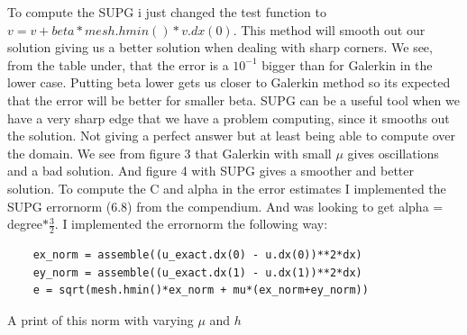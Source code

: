 \documentclass[a4paper,norsk]{article}
\begin{document}
To compute the SUPG i just changed the test function to  $v = v + beta * mesh.hmin() * v.dx(0)$. This method will smooth out our solution giving us a better solution when dealing with sharp corners. We see, from the table under, that the error is a $10^{-1}$ bigger than for Galerkin in the lower case. Putting beta lower gets us closer to Galerkin method so its expected that the error will be better for smaller beta.\newline
SUPG can be a useful tool when we have a very sharp edge that we have a problem computing, since it smooths out the solution. Not giving a perfect answer but at least being able to compute over the domain.\newline
We see from figure 3 that Galerkin with small $\mu$ gives oscillations and a bad solution. And figure 4 with SUPG gives a smoother and better solution.\newline
To compute the C and alpha in the error estimates I implemented the SUPG errornorm (6.8) from the compendium. And was looking to get alpha = degree$*\frac{3}{2}$. I implemented the errornorm the following way:
\begin{lstlisting}
    ex_norm = assemble((u_exact.dx(0) - u.dx(0))**2*dx)
    ey_norm = assemble((u_exact.dx(1) - u.dx(1))**2*dx)
    e = sqrt(mesh.hmin()*ex_norm + mu*(ex_norm+ey_norm))
\end{lstlisting}
A print of this norm with varying $\mu$ and $h$
\end{document}
